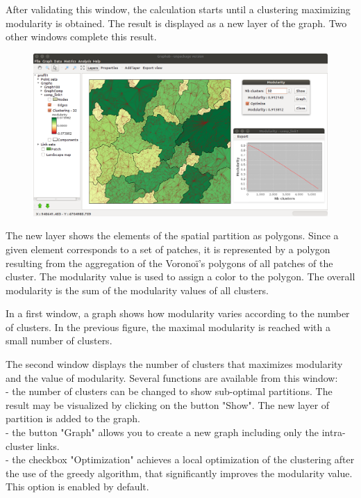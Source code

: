 \documentclass{article}
\begin{document}
After validating this window, the calculation starts until a clustering maximizing modularity is obtained. The result is displayed as a new layer of the graph. Two other windows complete this result.

\begin{figure}[H]
	\includegraphics[scale=0.36]{img/manual-en_cluster.png} 
\end{figure}

The new layer shows the elements of the spatial partition as polygons. Since a given element corresponds to a set of patches, it is represented by a polygon resulting from the aggregation of the Voronoï’s polygons of all patches of the cluster. The modularity value is used to assign a color to the polygon. The overall modularity is the sum of the modularity values of all clusters. 

In a first window, a graph shows how modularity varies according to the number of clusters. In the previous figure, the maximal modularity is reached with a small number of clusters.

The second window displays the number of clusters that maximizes modularity and the value of modularity.
Several functions are available from this window:\\
{}- the number of clusters can be changed to show sub-optimal partitions. The result may be visualized by clicking on the button "Show". The new layer of partition is added to the graph.\\
{}- the button "Graph" allows you to create a new graph including only the intra-cluster links.\\
{}- the checkbox "Optimization" achieves a local optimization of the clustering after the use of the greedy algorithm, that significantly improves the modularity value. This option is enabled by default.
\end{document}
